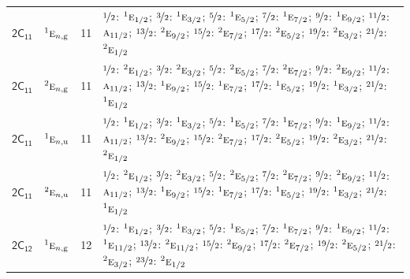 \documentclass[10pt,a4paper]{article}
\numberwithin{equation}{section}
\newcommand{\grp}[1]{\mathsf{#1}}
\newcommand{\irr}[1]{\text{\normalfont\scshape #1}}
\newcommand{\conjpair}[1]{{}^{#1}}
\newcommand{\ptag}[1]{\mathrm{#1}}
\newlength{\fillwidth}\newlength{\cellwidth}\newlength{\colwidth}
\begin{document}
{\begin{longtable}{@{}llr>{\RaggedRight\arraybackslash}p{\fillwidth}@{}}
\href{2C11.pdf}{$\grp{2C_{11}}$} & $\conjpair{1}\irr{e}_{n,\ptag{g}}$ & 11 & $\nicefrac{1}{2}$: $\conjpair{1}\irr{e}_{1/2}$; $\nicefrac{3}{2}$: $\conjpair{1}\irr{e}_{3/2}$; $\nicefrac{5}{2}$: $\conjpair{1}\irr{e}_{5/2}$; $\nicefrac{7}{2}$: $\conjpair{1}\irr{e}_{7/2}$; $\nicefrac{9}{2}$: $\conjpair{1}\irr{e}_{9/2}$; $\nicefrac{11}{2}$: $\irr{a}_{11/2}$; $\nicefrac{13}{2}$: $\conjpair{2}\irr{e}_{9/2}$; $\nicefrac{15}{2}$: $\conjpair{2}\irr{e}_{7/2}$; $\nicefrac{17}{2}$: $\conjpair{2}\irr{e}_{5/2}$; $\nicefrac{19}{2}$: $\conjpair{2}\irr{e}_{3/2}$; $\nicefrac{21}{2}$: $\conjpair{2}\irr{e}_{1/2}$\\
\href{2C11.pdf}{$\grp{2C_{11}}$} & $\conjpair{2}\irr{e}_{n,\ptag{g}}$ & 11 & $\nicefrac{1}{2}$: $\conjpair{2}\irr{e}_{1/2}$; $\nicefrac{3}{2}$: $\conjpair{2}\irr{e}_{3/2}$; $\nicefrac{5}{2}$: $\conjpair{2}\irr{e}_{5/2}$; $\nicefrac{7}{2}$: $\conjpair{2}\irr{e}_{7/2}$; $\nicefrac{9}{2}$: $\conjpair{2}\irr{e}_{9/2}$; $\nicefrac{11}{2}$: $\irr{a}_{11/2}$; $\nicefrac{13}{2}$: $\conjpair{1}\irr{e}_{9/2}$; $\nicefrac{15}{2}$: $\conjpair{1}\irr{e}_{7/2}$; $\nicefrac{17}{2}$: $\conjpair{1}\irr{e}_{5/2}$; $\nicefrac{19}{2}$: $\conjpair{1}\irr{e}_{3/2}$; $\nicefrac{21}{2}$: $\conjpair{1}\irr{e}_{1/2}$\\
\href{2C11.pdf}{$\grp{2C_{11}}$} & $\conjpair{1}\irr{e}_{n,\ptag{u}}$ & 11 & $\nicefrac{1}{2}$: $\conjpair{1}\irr{e}_{1/2}$; $\nicefrac{3}{2}$: $\conjpair{1}\irr{e}_{3/2}$; $\nicefrac{5}{2}$: $\conjpair{1}\irr{e}_{5/2}$; $\nicefrac{7}{2}$: $\conjpair{1}\irr{e}_{7/2}$; $\nicefrac{9}{2}$: $\conjpair{1}\irr{e}_{9/2}$; $\nicefrac{11}{2}$: $\irr{a}_{11/2}$; $\nicefrac{13}{2}$: $\conjpair{2}\irr{e}_{9/2}$; $\nicefrac{15}{2}$: $\conjpair{2}\irr{e}_{7/2}$; $\nicefrac{17}{2}$: $\conjpair{2}\irr{e}_{5/2}$; $\nicefrac{19}{2}$: $\conjpair{2}\irr{e}_{3/2}$; $\nicefrac{21}{2}$: $\conjpair{2}\irr{e}_{1/2}$\\
\href{2C11.pdf}{$\grp{2C_{11}}$} & $\conjpair{2}\irr{e}_{n,\ptag{u}}$ & 11 & $\nicefrac{1}{2}$: $\conjpair{2}\irr{e}_{1/2}$; $\nicefrac{3}{2}$: $\conjpair{2}\irr{e}_{3/2}$; $\nicefrac{5}{2}$: $\conjpair{2}\irr{e}_{5/2}$; $\nicefrac{7}{2}$: $\conjpair{2}\irr{e}_{7/2}$; $\nicefrac{9}{2}$: $\conjpair{2}\irr{e}_{9/2}$; $\nicefrac{11}{2}$: $\irr{a}_{11/2}$; $\nicefrac{13}{2}$: $\conjpair{1}\irr{e}_{9/2}$; $\nicefrac{15}{2}$: $\conjpair{1}\irr{e}_{7/2}$; $\nicefrac{17}{2}$: $\conjpair{1}\irr{e}_{5/2}$; $\nicefrac{19}{2}$: $\conjpair{1}\irr{e}_{3/2}$; $\nicefrac{21}{2}$: $\conjpair{1}\irr{e}_{1/2}$\\
\href{2C12.pdf}{$\grp{2C_{12}}$} & $\conjpair{1}\irr{e}_{n,\ptag{g}}$ & 12 & $\nicefrac{1}{2}$: $\conjpair{1}\irr{e}_{1/2}$; $\nicefrac{3}{2}$: $\conjpair{1}\irr{e}_{3/2}$; $\nicefrac{5}{2}$: $\conjpair{1}\irr{e}_{5/2}$; $\nicefrac{7}{2}$: $\conjpair{1}\irr{e}_{7/2}$; $\nicefrac{9}{2}$: $\conjpair{1}\irr{e}_{9/2}$; $\nicefrac{11}{2}$: $\conjpair{1}\irr{e}_{11/2}$; $\nicefrac{13}{2}$: $\conjpair{2}\irr{e}_{11/2}$; $\nicefrac{15}{2}$: $\conjpair{2}\irr{e}_{9/2}$; $\nicefrac{17}{2}$: $\conjpair{2}\irr{e}_{7/2}$; $\nicefrac{19}{2}$: $\conjpair{2}\irr{e}_{5/2}$; $\nicefrac{21}{2}$: $\conjpair{2}\irr{e}_{3/2}$; $\nicefrac{23}{2}$: $\conjpair{2}\irr{e}_{1/2}$\\

\end{longtable}}
\end{document}
